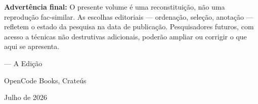 \vspace{0.6em}

\noindent\textbf{Advertência final:}
O presente volume é uma reconstituição, não uma reprodução fac-similar. As escolhas editoriais --- ordenação, seleção, anotação --- refletem o estado da pesquisa na data de publicação. Pesquisadores futuros, com acesso a técnicas não destrutivas adicionais, poderão ampliar ou corrigir o que aqui se apresenta.

\vspace{1.2em}

\begin{flushright}
--- A Edição\par
OpenCode Books, Crateús\par
Julho de 2026
\end{flushright}

\endgroup
\clearpage
